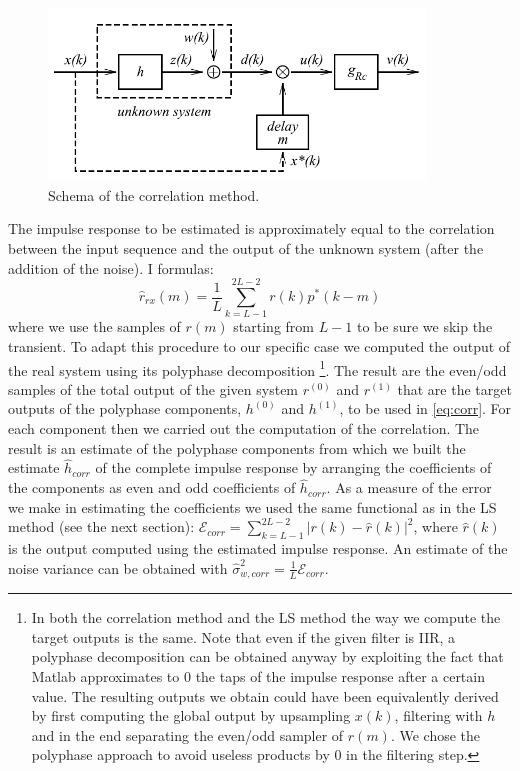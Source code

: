 \documentclass[a4paper,11.5pt]{article}
\begin{document}
\begin{figure}[ht]
	\begin{center}    
		\includegraphics[width=10cm]{figs/systemID.png}
		\caption{Schema of the correlation method.}
		\label{fig:systID}
	\end{center}
\end{figure} 

\noindent The impulse response to be estimated is approximately equal to the correlation between the input sequence and the output of the unknown system (after the addition of the noise). I formulas:
\begin{equation} \label{eq:corr}
\hat{r}_{rx}(m)= \frac{1}{L} \sum_{k=L-1}^{2L-2}r(k)p^*(k-m)
\end{equation}
\noindent where we use the samples of $r(m)$ starting from $L-1$ to be sure we skip the transient. To adapt this procedure to our specific case we computed the output of the real system using its polyphase decomposition \footnote{In both the correlation method and the LS method the way we compute the target outputs is the same. Note that even if the given filter is IIR, a polyphase decomposition can be obtained anyway by exploiting the fact that Matlab approximates to 0 the taps of the impulse response after a certain value. The resulting outputs we obtain could have been equivalently derived by first computing the global output by upsampling $x(k)$, filtering with $h$ and in the end separating the even/odd sampler of $r(m)$. We chose the polyphase approach to avoid useless products by 0 in the filtering step.}. The result are the even/odd samples of the total output of the given system $r^{(0)}$ and $r^{(1)}$ that are the target outputs of the polyphase components, $h^{(0)}$ and $h^{(1)}$, to be used in \ref{eq:corr}. For each component then we carried out the computation of the correlation. The result is an estimate of the polyphase components from which we built the estimate $\hat{h}_{corr}$ of the complete impulse response by arranging the coefficients of the components as even and odd coefficients of $\hat{h}_{corr}$. As a measure of the error we make in estimating the coefficients we used the same functional as in the LS method (see the next section): $\mathcal{E}_{corr} = \sum_{k=L-1}^{2L-2}|r(k)-\hat{r}(k)|^2$, where $\hat{r}(k)$ is the output computed using the estimated impulse response. An estimate of the noise variance can be obtained with $\hat{\sigma}_{w,corr}^2=\frac{1}{L}\mathcal{E}_{corr} $.
\end{document}

